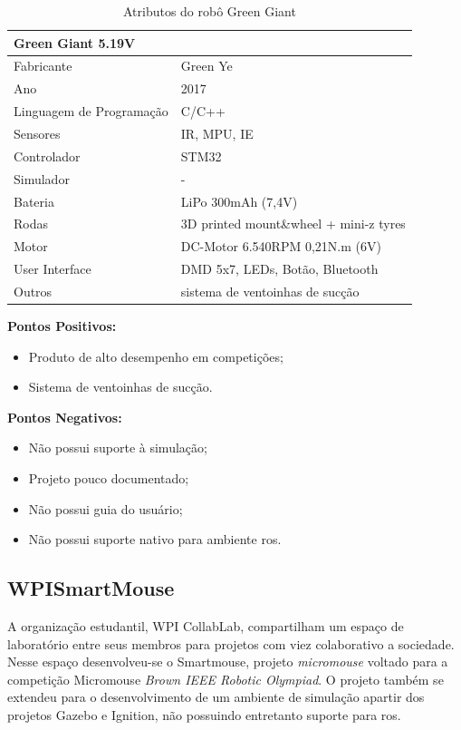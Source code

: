 \begin{table}[H]
	\centering
	\caption{Atributos do robô Green Giant}
	\label{tab:Green_Giant}
	\begin{tabular}{|l|l|}
		\hline
		\multicolumn{2}{|l|}{\textbf{Green Giant 5.19V}} \\ \hline
		Fabricante & Green Ye \\ \hline
		Ano & 2017 \\ \hline
		Linguagem de Programação & C/C++ \\ \hline
		Sensores & IR, MPU, IE \\ \hline
		Controlador & STM32 \\ \hline
		Simulador & - \\ \hline
		Bateria & LiPo 300mAh (7,4V) \\ \hline
		Rodas & 3D printed mount\&wheel + mini-z tyres \\ \hline
		Motor & DC-Motor 6.540RPM 0,21N.m (6V) \\ \hline
		User Interface & DMD 5x7, LEDs, Botão, Bluetooth \\ \hline
		Outros & sistema de ventoinhas de sucção \\ \hline
	\end{tabular}
\end{table}


\textbf{Pontos Positivos:}
\begin{itemize}
	\item Produto de alto desempenho em competições;
	\item Sistema de ventoinhas de sucção.
\end{itemize}


\textbf{Pontos Negativos:}
\begin{itemize}
	\item Não possui suporte à simulação;
	\item Projeto pouco documentado;
	\item Não possui guia do usuário;
	\item Não possui suporte nativo para ambiente \gls*{ros}.
\end{itemize}


\subsection{WPISmartMouse}
\hspace{0.5cm} A organização estudantil, WPI CollabLab, compartilham um espaço de laboratório entre seus membros para projetos com viez colaborativo a sociedade. Nesse espaço desenvolveu-se o Smartmouse, projeto \textit{micromouse} voltado para a competição Micromouse \textit{Brown IEEE Robotic  Olympiad}. O projeto também se extendeu para o desenvolvimento de um ambiente de simulação apartir dos projetos Gazebo e Ignition, não possuindo entretanto suporte para \gls*{ros}.

